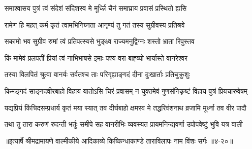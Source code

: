 \twolineshloka
{समाश्वासय पुत्रं त्वं संदेशं संदिशस्व मे}
{मूर्ध्न्नि चैनं समाघ्राय प्रवासं प्रस्थितो ह्यसि} %

\twolineshloka
{रामेण हि महत् कर्म कृतं त्वामभिनिघ्नता}
{आनृण्यं तु गतं तस्य सुग्रीवस्य प्रतिश्रवे} %

\twolineshloka
{सकामो भव सुग्रीव रुमां त्वं प्रतिपत्स्यसे}
{भुङ्क्ष्व राज्यमनुद्विग्नः शस्तो भ्राता रिपुस्तव} %

\twolineshloka
{किं मामेवं प्रलपतीं प्रियां त्वं नाभिभाषसे}
{इमाः पश्य वरा बाह्व्यो भार्यास्ते वानरेश्वर} %

\twolineshloka
{तस्या विलपितं श्रुत्वा वानर्यः सर्वतश्च ताः}
{परिगृह्याङ्गदं दीना दुःखार्ताः प्रतिचुक्रुशुः} %

\twolineshloka
{किमङ्गदं साङ्गदवीरबाहो विहाय यातोऽसि चिरं प्रवासम्}
{न युक्तमेवं गुणसंनिकृष्टं विहाय पुत्रं प्रियचारुवेषम्} %

\twolineshloka
{यद्यप्रियं किंचिदसम्प्रधार्य कृतं मया स्यात् तव दीर्घबाहो}
{क्षमस्व मे तद्धरिवंशनाथ व्रजामि मूर्ध्ना तव वीर पादौ} %

\twolineshloka
{तथा तु तारा करुणं रुदन्ती भर्तुः समीपे सह वानरीभिः}
{व्यवस्यत प्रायमनिन्द्यवर्णा उपोपवेष्टुं भुवि यत्र वाली} %


॥इत्यार्षे श्रीमद्रामायणे वाल्मीकीये आदिकाव्ये किष्किन्धाकाण्डे ताराविलापः नाम विंशः सर्गः ॥४-२०॥
